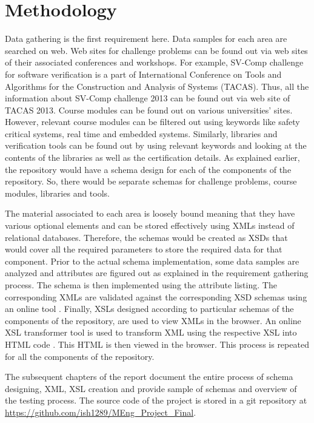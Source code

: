 \documentclass[11pt,letterpaper]{report}
\begin{document}
\chapter{Methodology} 
Data gathering is the first requirement here. Data samples for each area are searched on web. Web sites for challenge problems can be found out via web sites of their associated conferences and workshops. For example, SV-Comp challenge for software verification is a part of International Conference on Tools and Algorithms for the Construction and Analysis of Systems (TACAS). Thus, all the information about SV-Comp challenge 2013 can be found out via web site of TACAS 2013. Course modules can be found out on various universities' sites. However, relevant course modules can be filtered out using keywords like safety critical systems, real time and embedded systems. Similarly, libraries and verification tools can be found out by using relevant keywords and looking at the contents of the libraries as well as the certification details. As explained earlier, the repository would have a schema design for each of the components of the repository. So, there would be separate schemas for challenge problems, course modules, libraries and tools.

The material associated to each area is loosely bound meaning that they have various optional elements and can be stored effectively using XMLs instead of relational databases. Therefore, the schemas would be created as XSDs that would cover all the required parameters to store the required data for that component. Prior to the actual schema implementation, some data samples are analyzed and attributes are figured out as explained in the requirement gathering process. The schema is then implemented using the attribute listing. The corresponding XMLs are validated against the corresponding XSD schemas using an online tool \cite{olXSD}. Finally, XSLs designed according to particular schemas of the components of the repository, are used to view XMLs in the browser. An online XSL transformer tool is used to transform XML using the respective XSL into HTML code \cite{olXSL}. This HTML is then viewed in the browser. This process is repeated for all the components of the repository. 

The subsequent chapters of the report document the entire process of schema designing, XML, XSL creation and provide sample of schemas and overview of the testing process. The source code of the project is stored in a git repository at \url{https://github.com/ish1289/MEng_Project_Final}.
\end{document}
